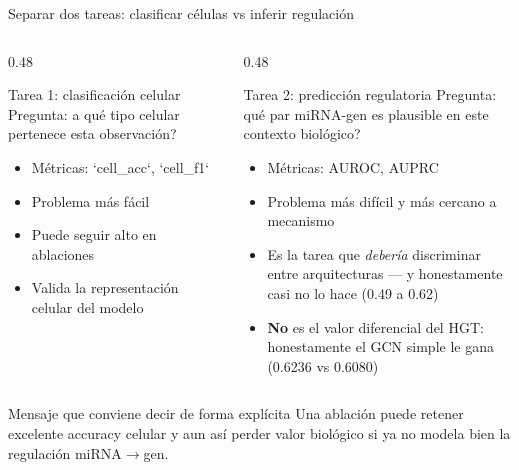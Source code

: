 \begin{frame}{Separar dos tareas: clasificar c\'elulas vs inferir regulaci\'on}
  \begin{columns}[T]
    \begin{column}{0.48\textwidth}
      \begin{block}{Tarea 1: clasificaci\'on celular}
        \small
        Pregunta: \textquestiondown{}a qu\'e tipo celular pertenece esta observaci\'on?
      \end{block}
      \begin{itemize}
        \item M\'etricas: `cell_acc`, `cell_f1`
        \item Problema m\'as f\'acil
        \item Puede seguir alto en ablaciones
        \item Valida la representaci\'on celular del modelo
      \end{itemize}
    \end{column}
    \begin{column}{0.48\textwidth}
      \begin{block}{Tarea 2: predicci\'on regulatoria}
        \small
        Pregunta: \textquestiondown{}qu\'e par miRNA-gen es plausible en este contexto biol\'ogico?
      \end{block}
      \begin{itemize}
        \item M\'etricas: AUROC, AUPRC
        \item Problema m\'as dif\'icil y m\'as cercano a mecanismo
        \item Es la tarea que \emph{deber\'ia} discriminar entre arquitecturas --- y honestamente casi no lo hace (0.49 a 0.62)
        \item \textbf{No} es el valor diferencial del HGT: honestamente el GCN simple le gana (0.6236 vs 0.6080)
      \end{itemize}
    \end{column}
  \end{columns}

  \vspace{0.5em}
  \begin{block}{Mensaje que conviene decir de forma expl\'icita}
    \small
    Una ablaci\'on puede retener excelente accuracy celular y aun as\'i perder valor biol\'ogico si ya no modela bien la regulaci\'on miRNA$\rightarrow$gen.
  \end{block}
\end{frame}

